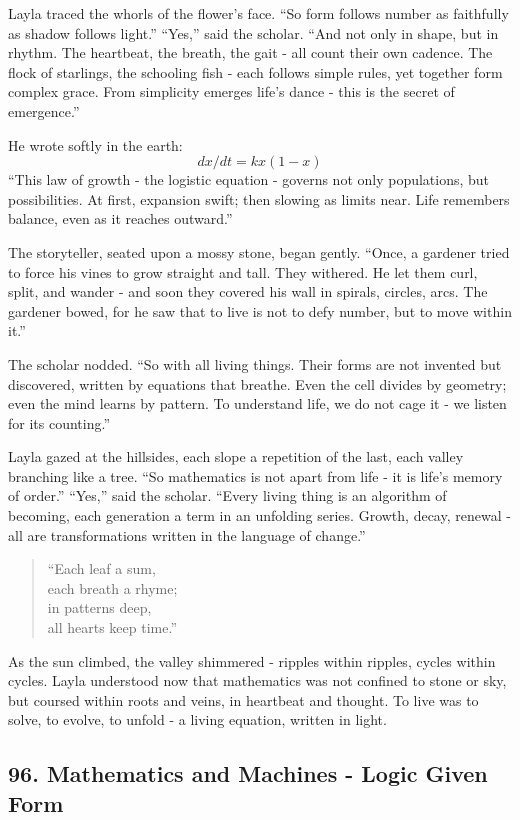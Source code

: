 \documentclass[
  letterpaper,
  DIV=11,
  numbers=noendperiod]{scrreprt}
\begin{document}
Layla traced the whorls of the flower's face. ``So form follows number
as faithfully as shadow follows light.'' ``Yes,'' said the scholar.
``And not only in shape, but in rhythm. The heartbeat, the breath, the
gait - all count their own cadence. The flock of starlings, the
schooling fish - each follows simple rules, yet together form complex
grace. From simplicity emerges life's dance - this is the secret of
emergence.''

He wrote softly in the earth: \[
dx/dt = kx(1 - x)
\] ``This law of growth - the logistic equation - governs not only
populations, but possibilities. At first, expansion swift; then slowing
as limits near. Life remembers balance, even as it reaches outward.''

The storyteller, seated upon a mossy stone, began gently. ``Once, a
gardener tried to force his vines to grow straight and tall. They
withered. He let them curl, split, and wander - and soon they covered
his wall in spirals, circles, arcs. The gardener bowed, for he saw that
to live is not to defy number, but to move within it.''

The scholar nodded. ``So with all living things. Their forms are not
invented but discovered, written by equations that breathe. Even the
cell divides by geometry; even the mind learns by pattern. To understand
life, we do not cage it - we listen for its counting.''

Layla gazed at the hillsides, each slope a repetition of the last, each
valley branching like a tree. ``So mathematics is not apart from life -
it is life's memory of order.'' ``Yes,'' said the scholar. ``Every
living thing is an algorithm of becoming, each generation a term in an
unfolding series. Growth, decay, renewal - all are transformations
written in the language of change.''

\begin{quote}
``Each leaf a sum,\\
each breath a rhyme;\\
in patterns deep,\\
all hearts keep time.''
\end{quote}

As the sun climbed, the valley shimmered - ripples within ripples,
cycles within cycles. Layla understood now that mathematics was not
confined to stone or sky, but coursed within roots and veins, in
heartbeat and thought. To live was to solve, to evolve, to unfold - a
living equation, written in light.

\subsection{96. Mathematics and Machines - Logic Given
Form}\label{mathematics-and-machines---logic-given-form}
\end{document}
